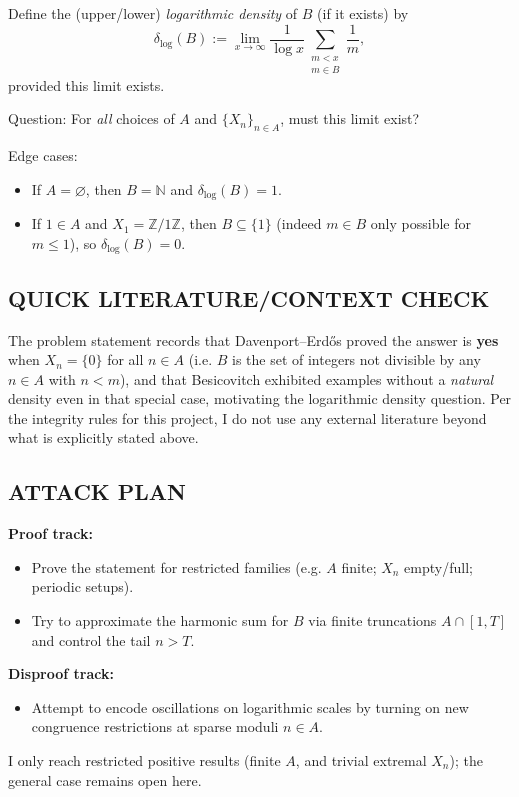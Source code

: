 Define the (upper/lower) \emph{logarithmic density} of $B$ (if it exists) by
\[
\delta_{\log}(B) := \lim_{x\to\infty}\frac{1}{\log x}\sum_{\substack{m<x\\m\in B}}\frac{1}{m},
\]
provided this limit exists.

Question: For \emph{all} choices of $A$ and $\{X_n\}_{n\in A}$, must this limit exist?

Edge cases:
\begin{itemize}
\item If $A=\varnothing$, then $B=\mathbb{N}$ and $\delta_{\log}(B)=1$.
\item If $1\in A$ and $X_1=\mathbb{Z}/1\mathbb{Z}$, then $B\subseteq\{1\}$ (indeed $m\in B$ only possible for $m\le 1$), so $\delta_{\log}(B)=0$.
\end{itemize}

\subsection*{QUICK LITERATURE/CONTEXT CHECK}
The problem statement records that Davenport--Erd\H{o}s proved the answer is \textbf{yes} when $X_n=\{0\}$ for all $n\in A$ (i.e. $B$ is the set of integers not divisible by any $n\in A$ with $n<m$), and that Besicovitch exhibited examples without a \emph{natural} density even in that special case, motivating the logarithmic density question.
Per the integrity rules for this project, I do not use any external literature beyond what is explicitly stated above.

\subsection*{ATTACK PLAN}
\textbf{Proof track:}
\begin{itemize}
\item Prove the statement for restricted families (e.g. $A$ finite; $X_n$ empty/full; periodic setups).
\item Try to approximate the harmonic sum for $B$ via finite truncations $A\cap[1,T]$ and control the tail $n>T$.
\end{itemize}
\textbf{Disproof track:}
\begin{itemize}
\item Attempt to encode oscillations on logarithmic scales by turning on new congruence restrictions at sparse moduli $n\in A$.
\end{itemize}
I only reach restricted positive results (finite $A$, and trivial extremal $X_n$); the general case remains open here.

